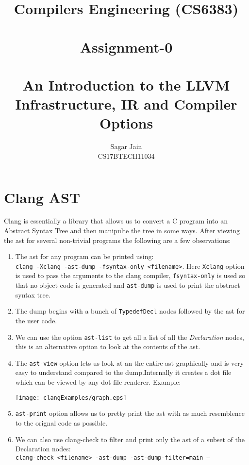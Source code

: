 \documentclass[12pt]{article}
\newcommand{\code}{\texttt}
\begin{document}
\title{\textbf{Compilers Engineering  (CS6383)}\\~\\Assignment-0\\~\\An Introduction to the LLVM Infrastructure, IR and Compiler Options}
\author{Sagar Jain\\CS17BTECH11034}
\maketitle
\begin{normalsize}
\tableofcontents
\end{normalsize}
\newpage
\section{Clang AST}
Clang is essentially a library that allows us to convert a  C program into an Abstract Syntax Tree and then manipulte the tree in some ways.
After viewing the ast for several non-trivial programs the following are a few observations:
\begin{enumerate}
\item The ast for any program can be printed using:\\ \code{clang -Xclang -ast-dump -fsyntax-only <filename>}. Here \code{Xclang} option is used to pass the arguments to the clang compiler, \code{fsyntax-only} is used so that no object code is generated and \code{ast-dump} is used to print the abstract syntax tree.
\item The dump begins with a bunch of \code{TypedefDecl} nodes followed by the ast for the user code.
\item We can use the option \code{ast-list} to get all a list of all the \textit{Declaration} nodes, this is an alternative option to look at the contents of the ast.
\item The \code{ast-view} option lets us look at an the entire ast graphically and is very easy to understand compared to the dump.Internally it creates a dot file which can be viewed by any dot file renderer. Example:
\begin{center}
\texttt{[image: clangExamples/graph.eps]}
\end{center}
\item \texttt{ast-print} option allows us to pretty print the ast with as much resemblence to the orignal code as possible.
\item We can also use clang-check to filter and print only the ast of a subset of the Declaration nodes:\\
\code{clang-check <filename> -ast-dump -ast-dump-filter=main --}
\end{enumerate}
\end{document}
